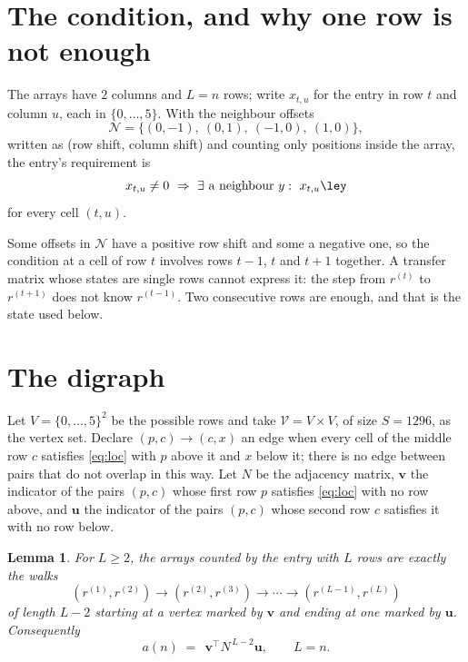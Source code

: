 \documentclass[11pt,a4paper]{article}
\theoremstyle{plain}
\newtheorem{lemma}[theorem]{Lemma}
\theoremstyle{definition}
\begin{document}
\section{The condition, and why one row is not enough}

The arrays have $2$ columns and $L=n$ rows; write $x_{t,u}$ for the entry in
row $t$ and column $u$, each in $\{0,\dots,5\}$. With the neighbour offsets
\[
\mathcal N=\{(0,-1),\ (0,1),\ (-1,0),\ (1,0)\},
\]
written as (row shift, column shift) and counting only positions inside the array, the
entry's requirement is
\begin{equation}\label{eq:loc}
x_{t,u}\ne0\ \Rightarrow\ \exists\ \text{a neighbour }y:\ x_{t,u}\ley
\end{equation}
for every cell $(t,u)$.

Some offsets in $\mathcal N$ have a positive row shift and some a negative one, so the
condition at a cell of row $t$ involves rows $t-1$, $t$ and $t+1$ together. A transfer
matrix whose states are single rows cannot express it: the step from $r^{(t)}$ to
$r^{(t+1)}$ does not know $r^{(t-1)}$. Two consecutive rows are enough, and that is
the state used below.

\section{The digraph}

Let $V=\{0,\dots,5\}^{2}$ be the possible rows and take
$\mathcal V=V\times V$, of size $S=1296$, as the vertex set. Declare $(p,c)\to(c,x)$ an edge
when every cell of the middle row $c$ satisfies \eqref{eq:loc} with $p$ above it and $x$
below it; there is no edge between pairs that do not overlap in this way. Let $N$ be the
adjacency matrix, $\mathbf{v}$ the indicator of the pairs $(p,c)$ whose first row $p$
satisfies \eqref{eq:loc} with no row above, and $\mathbf{u}$ the indicator of
the pairs $(p,c)$ whose second row $c$ satisfies it with no row below.

\begin{lemma}\label{lem:walk}
For $L\ge2$, the arrays counted by the entry with $L$ rows are exactly the walks
\[
(r^{(1)},r^{(2)})\to(r^{(2)},r^{(3)})\to\cdots\to(r^{(L-1)},r^{(L)})
\]
of length $L-2$ starting at a vertex marked by $\mathbf{v}$ and ending at one marked by
$\mathbf{u}$. Consequently
\[
a(n)\;=\;\,\mathbf{v}^{\!\top}N^{\,L-2}\mathbf{u},\qquad L=n .
\]
\end{lemma}
\end{document}
